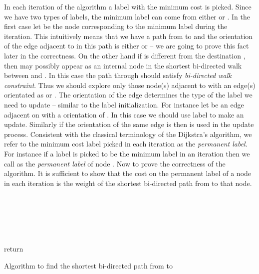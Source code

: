 \documentclass[runningheads]{llncs}
\begin{document}
In each iteration of the algorithm a label with the minimum cost is picked. 
Since we have two types of labels, the minimum label can come from either 
 or . In the first case let  be the node corresponding
to the minimum label during the iteration. This intuitively means that we 
have a path from  to  and the orientation of the edge adjacent to 
 in this path is either  or  -- we are going to 
prove this fact later in the correctness. On the other hand if  is 
different from the destination , then  may possibly appear as an 
internal node in the shortest bi-directed walk between  and . In this 
case the path through  should satisfy {\em bi-directed walk constraint}. 
Thus we should explore only those node(s) adjacent to  with an edge(s) 
orientated as  or . The orientation 
of the edge determines the type of the label we need to update -- similar to 
the label initialization. For instance let  be an edge adjacent on 
 with a orientation of . In this case we should use label 
 to make an update. Similarly if the orientation of the same edge 
is  then  is used in the update process. Consistent
with the classical terminology of the Dijkstra's algorithm, we refer to the 
minimum cost label picked in each iteration as the {\em permanent label}.
For instance if a label  is picked to be the minimum label in an
iteration then we call  as the {\em permanent label} of node .
Now to prove the correctness of the algorithm. It is sufficient to show that the
cost on the permanent label of a node in each iteration is the weight of the shortest
bi-directed path from  to that node. 


\linesnumbered
\begin{algorithm}
\\
 \\
 \\
\\
 \\
{\sf return} 

\caption{Algorithm to find the shortest bi-directed path from  to  }
\label{algo:shortest_path}
\end{algorithm}
\end{document}
